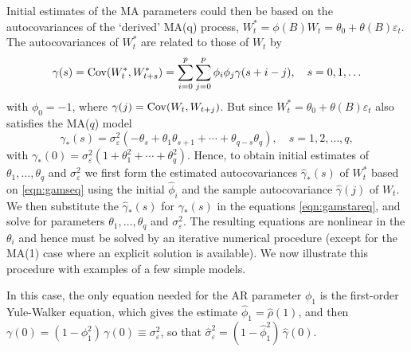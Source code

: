 Initial estimates of the MA parameters could then be based on the autocovariances of the `derived' MA(q) process, $W_t^* = \phi(B) W_t = \theta_0 + \theta(B) \varepsilon_t$. The autocovariances of $W_t^*$ are related to those of $W_t$ by
	\begin{equation} \label{eqn:gamseq}
	\gamma(s) = \cov(W_t^*, W_{t+s}^*) = \sum_{i=0}^p \sum_{j=0}^p \phi_i \phi_j \gamma(s+i-j), \quad s = 0,1,\ldots
	\end{equation}
with $\phi_0 = -1$, where $\gamma(j) = \operatorname{Cov}(W_t, W_{t+j})$. But since $W_t^* = \theta_0 + \theta(B)\varepsilon_t$ also satisfies the MA($q$) model
	\begin{equation} \label{eqn:gamstareq}
	\gamma_*(s) = \sigma_{\varepsilon}^2 (-\theta_s + \theta_1 \theta_{s+1} + \cdots + \theta_{q-s}\theta_q), \quad s = 1,2,\ldots,q,
	\end{equation}
with $\gamma_*(0) = \sigma_{\varepsilon}^2 (1 + \theta_1^2 + \cdots + \theta_q^2)$. Hence, to obtain initial estimates of $\theta_1, \ldots, \theta_q$ and $\sigma_{\varepsilon}^2$ we first form the estimated autocovariances $\hat{\gamma}_*(s)$ of $W_t^*$ based on \eqref{eqn:gamseq} using the initial $\hat{\phi}_{i}$ and the sample autocovariance $\hat{\gamma}(j)$ of $W_t$. We then substitute the $\hat{\gamma}_*(s)$ for $\gamma_*(s)$ in the equations \eqref{eqn:gamstareq}, and solve for parameters $\theta_1, \ldots, \theta_q$ and $\sigma_{\varepsilon}^2$. The resulting equations are nonlinear in the $\theta_i$ and hence must be solved by an iterative numerical procedure (except for the MA(1) case where an explicit solution is available). We now illustrate this procedure with examples of a few simple models. 


\begin{ex}[AR(1) Model]
 In this case, the only equation needed for the AR parameter $\phi_1$ is the first-order Yule-Walker equation, which gives the estimate $\hat{\phi}_1 = \hat{\rho}(1)$, and then $\gamma(0) = (1- \phi_1^2)\,\gamma(0) \equiv \sigma_{\varepsilon}^2$, so that $\hat{\sigma}_{\varepsilon}^2 = (1 - \hat{\phi}_1^2)\,\hat{\gamma}(0)$. \xqed
 \end{ex}


